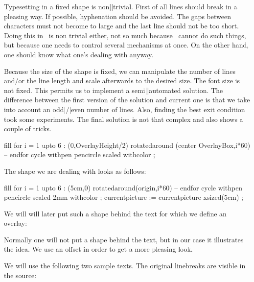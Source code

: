 Typesetting in a fixed shape is non||trivial. First of all lines should break in
a pleasing way. If possible, hyphenation should be avoided. The gaps between
characters must not become to large and the last line should not be too short.
Doing this in \TEX\ is non trivial either, not so much because \TEX\ cannot do
such things, but because one needs to control several mechanisms at once. On the
other hand, one should know what one's dealing with anyway.

Because the size of the shape is fixed, we can manipulate the number of lines
and/or the line length and scale afterwards to the desired size. The font size is
not fixed. This permits us to implement a semi||automated solution. The
difference between the first version of the solution and current one is that we
take into account an odd|/|even number of lines. Also, finding the best exit
condition took some experiments. The final solution is not that complex and also
shows a couple of tricks.

\startbuffer
\definecolor[BeeColorA][r=.4,g=.5,b=.6]
\definecolor[BeeColorB][r=.5,g=.6,b=.4]
\definecolor[BeeColorC][r=.6,g=.4,b=.5]

\definecolor[BeeColor] [BeeColorA]


  fill
    for i = 1 upto 6 : (0,OverlayHeight/2)
      rotatedaround (center OverlayBox,i*60) --
    endfor cycle
    withpen pencircle scaled 
    withcolor  ;
\stopuniqueMPgraphic
\stopbuffer

\getbuffer

The shape we are dealing with looks as follows:

\startlinecorrection
\startMPcode
  fill
    for i = 1 upto 6 : (5cm,0)
      rotatedaround(origin,i*60) --
    endfor cycle
    withpen pencircle scaled 2mm
    withcolor  ;
  currentpicture := currentpicture xsized(5cm) ;
\stopMPcode
\stoplinecorrection

We will will later put such a shape behind the text for which we define an
overlay:

\typebuffer

Normally one will not put a shape behind the text, but in our case it illustrates
the idea. We use an offset in order to get a more pleasing look.

We will use the following two sample texts. The original linebreaks are visible
in the source:

